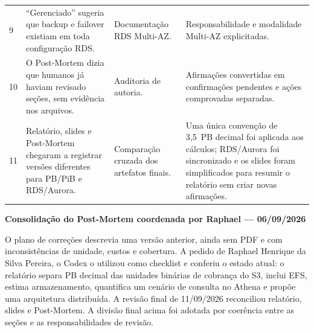 \documentclass[11pt,a4paper]{article}
\newcommand{\destaque}[2]{\begin{center}\begin{minipage}{.96\textwidth}
  \colorbox{fundo}{\begin{minipage}{\dimexpr\linewidth-2\fboxsep}
  \textbf{\color{azul}#1}\par\small #2\end{minipage}}\end{minipage}\end{center}}
\begin{document}
\begin{longtable}{@{}p{.7cm}p{5cm}p{4.4cm}p{4.6cm}@{}}
9 & ``Gerenciado'' sugeria que backup e failover existiam em toda configuração RDS. & Documentação RDS Multi-AZ. & Responsabilidade e modalidade Multi-AZ explicitadas.\\
10 & O Post-Mortem dizia que humanos já haviam revisado seções, sem evidência nos arquivos. & Auditoria de autoria. & Afirmações convertidas em confirmações pendentes e ações comprovadas separadas.\\
11 & Relatório, slides e Post-Mortem chegaram a registrar versões diferentes para PB/PiB e RDS/Aurora. & Comparação cruzada dos artefatos finais. & Uma única convenção de 3,5~PB decimal foi aplicada aos cálculos; RDS/Aurora foi sincronizado e os slides foram simplificados para resumir o relatório sem criar novas afirmações.\\\bottomrule
\end{longtable}

\destaque{Consolidação do Post-Mortem coordenada por Raphael --- 06/09/2026}{%
O plano de correções descrevia uma versão anterior, ainda sem PDF e com inconsistências de unidade,
custos e cobertura. A pedido de Raphael Henrique da Silva Pereira, o Codex o utilizou como checklist
e conferiu o estado atual: o relatório separa PB decimal das unidades binárias de cobrança do S3, inclui EFS, estima armazenamento, quantifica um cenário de consulta no Athena e propõe uma
arquitetura distribuída. A revisão final de 11/09/2026 reconciliou relatório, slides e Post-Mortem. A divisão final acima foi
adotada por coerência entre as seções e as responsabilidades de revisão.}
\end{document}
